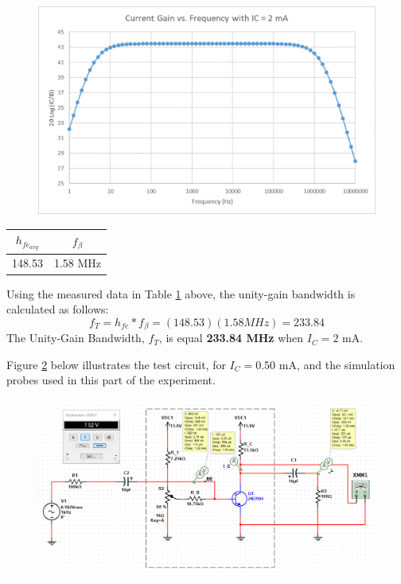 \documentclass{article}
\begin{document}
	\pagebreak
	
	\begin{figure}[!ht]
		\centering
		\includegraphics[width=0.6\linewidth]{part4-currentGain-2ma.png}
		\label{f29}
	\end{figure}
	
	\begin{table}[!ht]
		\centering
		\label{t10}
		\begin{tabular}{|c|c|}
			\hline
			$h_{fe_{avg}}$ & $f_{\beta}$\\
			\hline\hline
			148.53 & 1.58 MHz\\
			\hline
		\end{tabular}
	\end{table}	
	
	\noindent Using the measured data in Table \ref{t10} above, the unity-gain bandwidth is calculated as follows:
	$$f_T = h_{fe} * f_{\beta} = (148.53)(1.58 MHz) = 233.84$$
	The Unity-Gain Bandwidth, $f_T$, is equal \textbf{233.84 MHz} when $I_C = 2$ mA.
	
	\pagebreak
	
	\noindent Figure \ref{f30} below illustrates the test circuit, for $I_C = 0.50$ mA, and the simulation probes used in this part of the experiment.
	\begin{figure}[!ht]
		\centering
		\includegraphics[width=\linewidth]{part4-e-circuit-0.5ma.png}
		\label{f30}
	\end{figure}
	
\end{document}
